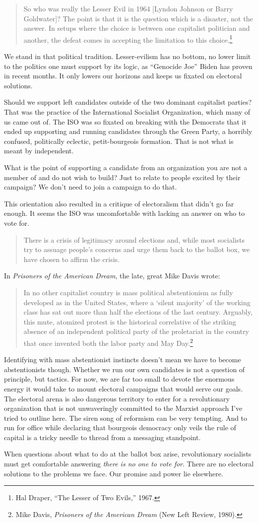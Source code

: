\blockquote{So who was really the Lesser Evil in 1964 [Lyndon Johnson or Barry Goldwater]? The point is that it is the question which is a disaster, not the answer. In setups where the choice is between one capitalist politician and another, the defeat comes in accepting the limitation to this choice.\footnote{Hal Draper, ``The Lesser of Two Evils,'' 1967.}}

We stand in that political tradition. Lesser-evilism has no bottom, no lower limit to the politics one must support by its logic, as ``Genocide Joe'' Biden has proven in recent months. It only lowers our horizons and keeps us fixated on electoral solutions.

Should we support left candidates outside of the two dominant capitalist parties? That was the practice of the International Socialist Organization, which many of us came out of. The ISO was so fixated on breaking with the Democrats that it ended up supporting and running candidates through the Green Party, a horribly confused, politically eclectic, petit-bourgeois formation. That is not what is meant by independent.

What is the point of supporting a candidate from an organization you are not a member of and do not wish to build? Just to relate to people excited by their campaign? We don't need to join a campaign to do that.

This orientation also resulted in a critique of electoralism that didn't go far enough. It seems the ISO was uncomfortable with lacking an answer on who to vote for.

\blockquote{There is a crisis of legitimacy around elections and, while most socialists try to assuage people's concerns and urge them back to the ballot box, we have chosen to affirm the crisis.}

In \emph{Prisoners of the American Dream}, the late, great Mike Davis wrote:

\blockquote{In no other capitalist country is mass political abstentionism as fully developed as in the United States, where a `silent majority' of the working class has sat out more than half the elections of the last century. Arguably, this mute, atomized protest is the historical correlative of the striking absence of an independent political party of the proletariat in the country that once invented both the labor party and May Day.\footnote{Mike Davis, \emph{Prisoners of the American Dream} (New Left Review, 1980).}}

Identifying with mass abstentionist instincts doesn't mean we have to become abstentionists though. Whether we run our own candidates is not a question of principle, but tactics. For now, we are far too small to devote the enormous energy it would take to mount electoral campaigns that would serve our goals. The electoral arena is also dangerous territory to enter for a revolutionary organization that is not unwaveringly committed to the Marxist approach I've tried to outline here. The siren song of reformism can be very tempting. And to run for office while declaring that bourgeois democracy only veils the rule of capital is a tricky needle to thread from a messaging standpoint.

When questions about what to do at the ballot box arise, revolutionary socialists must get comfortable answering \emph{there is no one to vote for}. There are no electoral solutions to the problems we face. Our promise and power lie elsewhere.
